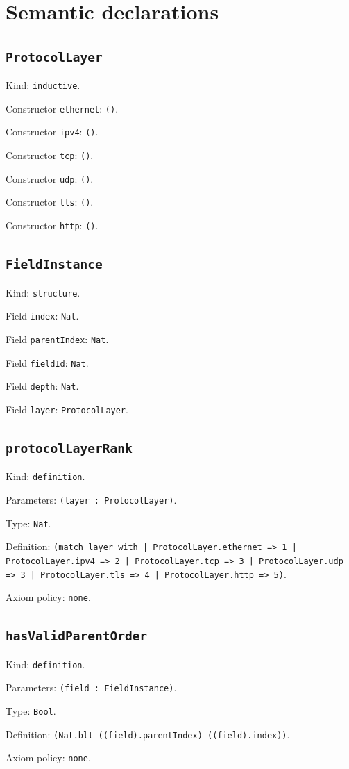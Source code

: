 \documentclass[11pt]{article}
\begin{document}
\section*{Semantic declarations}
\subsection*{\texttt{ProtocolLayer}}
\noindent Kind: \texttt{inductive}.\par
\noindent Constructor \texttt{ethernet}: \texttt{()}.\par
\noindent Constructor \texttt{ipv4}: \texttt{()}.\par
\noindent Constructor \texttt{tcp}: \texttt{()}.\par
\noindent Constructor \texttt{udp}: \texttt{()}.\par
\noindent Constructor \texttt{tls}: \texttt{()}.\par
\noindent Constructor \texttt{http}: \texttt{()}.\par
\subsection*{\texttt{FieldInstance}}
\noindent Kind: \texttt{structure}.\par
\noindent Field \texttt{index}: \texttt{Nat}.\par
\noindent Field \texttt{parentIndex}: \texttt{Nat}.\par
\noindent Field \texttt{fieldId}: \texttt{Nat}.\par
\noindent Field \texttt{depth}: \texttt{Nat}.\par
\noindent Field \texttt{layer}: \texttt{ProtocolLayer}.\par
\subsection*{\texttt{protocolLayerRank}}
\noindent Kind: \texttt{definition}.\par
\noindent Parameters: \texttt{(layer : ProtocolLayer)}.\par
\noindent Type: \texttt{Nat}.\par
\noindent Definition: \texttt{(match layer with | ProtocolLayer.ethernet => 1 | ProtocolLayer.ipv4 => 2 | ProtocolLayer.tcp => 3 | ProtocolLayer.udp => 3 | ProtocolLayer.tls => 4 | ProtocolLayer.http => 5)}.\par
\noindent Axiom policy: \texttt{none}.\par
\subsection*{\texttt{hasValidParentOrder}}
\noindent Kind: \texttt{definition}.\par
\noindent Parameters: \texttt{(field : FieldInstance)}.\par
\noindent Type: \texttt{Bool}.\par
\noindent Definition: \texttt{(Nat.blt ((field).parentIndex) ((field).index))}.\par
\noindent Axiom policy: \texttt{none}.\par
\end{document}
